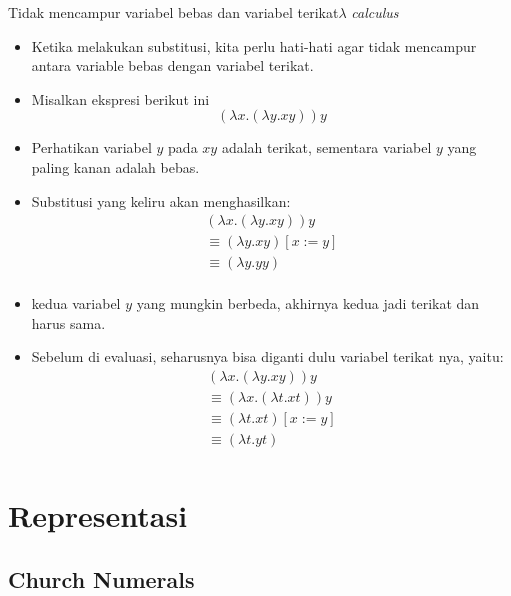 \documentclass[aspectratio=1610,10pt,handout]{beamer}
\newcommand{\lc}{$\lambda$ {\it calculus}\ }
\begin{document}
\begin{frame}{Tidak mencampur variabel bebas dan variabel terikat}{\lc }

	\begin{itemize}
		\item<1-> Ketika melakukan substitusi, kita perlu hati-hati agar tidak mencampur antara variable bebas dengan variabel terikat.
		\item<1-> Misalkan ekspresi berikut ini
		$$(\lambda x. (\lambda y. xy)) y$$
		\item<2-> Perhatikan variabel $y$ pada $xy$ adalah terikat, sementara variabel $y$ yang paling kanan adalah bebas.

		\item<3-> Substitusi yang keliru akan menghasilkan:
		\[
		\begin{array}{l}
		(\lambda x. (\lambda y. xy)) y \\
		\equiv (\lambda y. xy) [x:= y] \\
		\equiv (\lambda y.yy) \\
		\end{array}
		\]
		\item<3-> kedua variabel $y$ yang mungkin berbeda,  akhirnya kedua jadi terikat dan harus sama.
		\item<4-> Sebelum di evaluasi, seharusnya bisa diganti dulu variabel terikat nya, yaitu:
		\[
		\begin{array}{l}
		(\lambda x. (\lambda y. xy)) y \\
		\equiv (\lambda x. (\lambda t. xt)) y \\
		\equiv (\lambda t. xt) [x:= y] \\
		\equiv (\lambda t.yt) \\
		\end{array}
		\]

	\end{itemize}
\end{frame}

\section{Representasi}

\subsection{Church Numerals}
\end{document}
